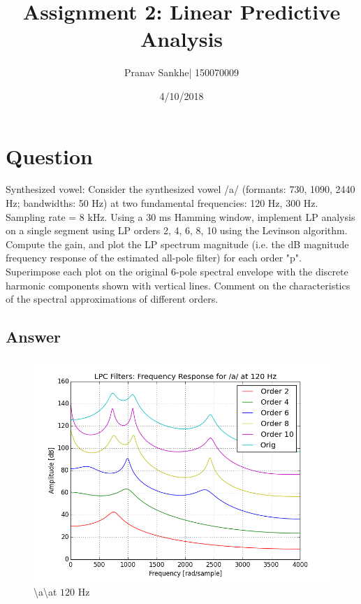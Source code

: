 \documentclass[a4paper]{article}
\title{Assignment 2: Linear Predictive Analysis}
\author{Pranav Sankhe| 150070009}
\date{4/10/2018}
\begin{document}
\maketitle

\section{Question}
Synthesized vowel: Consider the synthesized vowel /a/ (formants: 730, 1090, 2440 Hz; bandwidths: 50 Hz) at two fundamental frequencies: 120 Hz, 300 Hz. Sampling rate = 8 kHz. Using a 30 ms Hamming window, implement LP analysis on a single segment using LP orders 2, 4, 6, 8, 10 using the Levinson algorithm. Compute the gain, and plot the LP spectrum magnitude (i.e. the dB magnitude frequency response of the estimated all-pole filter) for each order "p". Superimpose each plot on the original 6-pole spectral envelope with the discrete harmonic components shown with vertical lines. Comment on the characteristics of the spectral approximations of different orders.

\subsection{Answer}

\begin{figure}[h!]
    \includegraphics[width=\linewidth]{./images/120.png}
    \caption{ \textbackslash a\textbackslash at $120$ Hz}
    \label{fig:1}
\end{figure}
\end{document}
